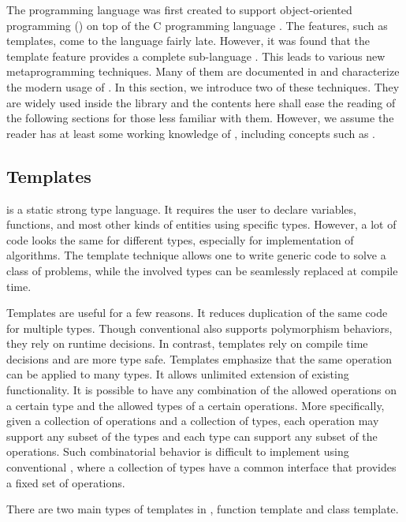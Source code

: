 The \cpp programming language \cite{cpp03} was first created to support
object-oriented programming (\oop) on top of the C programming language
\cite{evolutioncpp}.  The features, such as templates, come to the language
fairly late. However, it was found that the \cpp template feature provides a
complete sub-language \cite{cpptemplateturing}. This leads to various new
metaprogramming techniques. Many of them are documented in \cite{moderncpp}
and characterize the modern usage of \cpp. In this section, we introduce two
of these techniques. They are widely used inside the \vsmc library and the
contents here shall ease the reading of the following sections for those less
familiar with them. However, we assume the reader has at least some working
knowledge of \cpp, including concepts such as \oop.

\subsection{Templates}
\label{sub:Templates}

\cpp is a static strong type language. It requires the user to declare
variables, functions, and most other kinds of entities using specific types.
However, a lot of code looks the same for different types, especially for
implementation of algorithms. The \cpp template technique allows one to write
generic code to solve a class of problems, while the involved types can be
seamlessly replaced at compile time.

Templates are useful for a few reasons. It reduces duplication of the same
code for multiple types. Though conventional \oop also supports polymorphism
behaviors, they rely on runtime decisions. In contrast, templates rely on
compile time decisions and are more type safe. Templates emphasize that the
same operation can be applied to many types. It allows unlimited extension of
existing functionality. It is possible to have any combination of the allowed
operations on a certain type and the allowed types of a certain operations.
More specifically, given a collection of operations and a collection of types,
each operation may support any subset of the types and each type can support
any subset of the operations. Such combinatorial behavior is difficult to
implement using conventional \oop, where a collection of types have a common
interface that provides a fixed set of operations.

There are two main types of templates in \cpp, function template and class
template.

